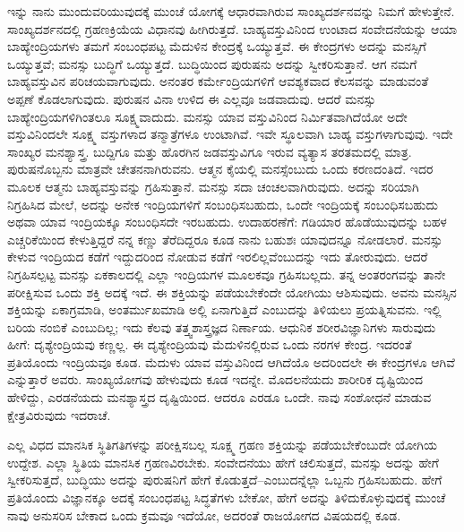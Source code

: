ಇನ್ನು ನಾನು ಮುಂದುವರಿಯುವುದಕ್ಕೆ ಮುಂಚೆ ಯೋಗಕ್ಕೆ ಆಧಾರವಾಗಿರುವ ಸಾಂಖ್ಯದರ್ಶನವನ್ನು ನಿಮಗೆ ಹೇಳುತ್ತೇನೆ. ಸಾಂಖ್ಯದರ್ಶನದಲ್ಲಿ ಗ್ರಹಣಕ್ರಿಯೆಯ ವಿಧಾನವು ಹೀಗಿರುತ್ತದೆ. ಬಾಹ್ಯವಸ್ತುವಿನಿಂದ ಉಂಟಾದ ಸಂವೇದನೆಯನ್ನು ಆಯಾ ಬಾಹ್ಯೇಂದ್ರಿಯಗಳು ತಮಗೆ ಸಂಬಂಧಪಟ್ಟ ಮೆದುಳಿನ ಕೇಂದ್ರಕ್ಕೆ ಒಯ್ಯುತ್ತವೆ. ಈ ಕೇಂದ್ರಗಳು ಅದನ್ನು ಮನಸ್ಸಿಗೆ ಒಯ್ಯುತ್ತವೆ; ಮನಸ್ಸು ಬುದ್ಧಿಗೆ ಒಯ್ಯುತ್ತದೆ. ಬುದ್ಧಿಯಿಂದ ಪುರುಷನು ಅದನ್ನು ಸ್ವೀಕರಿಸುತ್ತಾನೆ. ಆಗ ನಮಗೆ ಬಾಹ್ಯವಸ್ತುವಿನ ಪರಿಚಯವಾಗುವುದು. ಅನಂತರ ಕರ್ಮೇಂದ್ರಿಯಗಳಿಗೆ ಆವಶ್ಯಕವಾದ ಕೆಲಸವನ್ನು ಮಾಡುವಂತೆ ಅಪ್ಪಣೆ ಕೊಡಲಾಗುವುದು. ಪುರುಷನ ವಿನಾ ಉಳಿದ ಈ ಎಲ್ಲವೂ ಜಡವಾದುವು. ಆದರೆ ಮನಸ್ಸು ಬಾಹ್ಯೇಂದ್ರಿಯಗಳಿಗಿಂತಲೂ ಸೂಕ್ಷ್ಮವಾದುದು. ಮನಸ್ಸು ಯಾವ ವಸ್ತುವಿನಿಂದ ನಿರ್ಮಿತವಾಗಿದೆಯೋ ಅದೇ ವಸ್ತುವಿನಿಂದಲೇ ಸೂಕ್ಷ್ಮ ವಸ್ತುಗಳಾದ ತನ್ಮಾತ್ರೆಗಳೂ ಉಂಟಾಗಿವೆ. ಇವೇ ಸ್ಥೂಲವಾಗಿ ಬಾಹ್ಯ ವಸ್ತುಗಳಾಗುವುವು. ಇದೇ ಸಾಂಖ್ಯರ ಮನಶ್ಯಾಸ್ತ್ರ. ಬುದ್ದಿಗೂ ಮತ್ತು ಹೊರಗಿನ ಜಡವಸ್ತುವಿಗೂ ಇರುವ ವ್ಯತ್ಯಾಸ ತರತಮದಲ್ಲಿ ಮಾತ್ರ. ಪುರುಷನೊಬ್ಬನು ಮಾತ್ರವೇ ಚೇತನನಾಗಿರುವನು. ಆತ್ಮನ ಕೈಯಲ್ಲಿ ಮನಸ್ಸೆಂಬುದು ಒಂದು ಕರಣದಂತಿದೆ. ಇದರ ಮೂಲಕ ಆತ್ಮನು ಬಾಹ್ಯವಸ್ತುವನ್ನು ಗ್ರಹಿಸುತ್ತಾನೆ. ಮನಸ್ಸು ಸದಾ ಚಂಚಲವಾಗಿರುವುದು. ಅದನ್ನು ಸರಿಯಾಗಿ ನಿಗ್ರಹಿಸಿದ ಮೇಲೆ, ಅದನ್ನು ಅನೇಕ ಇಂದ್ರಿಯಗಳಿಗೆ ಸಂಬಂಧಿಸಬಹುದು, ಒಂದೇ ಇಂದ್ರಿಯಕ್ಕೆ ಸಂಬಂಧಿಸಬಹುದು ಅಥವಾ ಯಾವ ಇಂದ್ರಿಯಕ್ಕೂ ಸಂಬಂಧಿಸದೇ ಇರಬಹುದು. ಉದಾಹರಣೆಗೆ: ಗಡಿಯಾರ ಹೊಡೆಯುವುದನ್ನು ಬಹಳ ಎಚ್ಚರಿಕೆಯಿಂದ ಕೇಳುತ್ತಿದ್ದರೆ ನನ್ನ ಕಣ್ಣು ತೆರೆದಿದ್ದರೂ ಕೂಡ ನಾನು ಬಹುಶಃ ಯಾವುದನ್ನೂ ನೋಡಲಾರೆ. ಮನಸ್ಸು ಕೇಳುವ ಇಂದ್ರಿಯದ ಕಡೆಗೆ ಇದ್ದುದರಿಂದ ನೋಡುವ ಕಡೆಗೆ ಇರಲಿಲ್ಲವೆಂಬುದನ್ನು ಇದು ತೋರುವುದು. ಆದರೆ ನಿಗ್ರಹಿಸಲ್ಪಟ್ಟ ಮನಸ್ಸು ಏಕಕಾಲದಲ್ಲಿ ಎಲ್ಲಾ ಇಂದ್ರಿಯಗಳ ಮೂಲಕವೂ ಗ್ರಹಿಸಬಲ್ಲದು. ತನ್ನ ಅಂತರಂಗವನ್ನು ತಾನೇ ಪರೀಕ್ಷಿಸುವ ಒಂದು ಶಕ್ತಿ ಅದಕ್ಕೆ ಇದೆ. ಈ ಶಕ್ತಿಯನ್ನು ಪಡೆಯಬೇಕೆಂದೇ ಯೋಗಿಯು ಆಶಿಸುವುದು. ಅವನು ಮನಸ್ಸಿನ ಶಕ್ತಿಯನ್ನು ಏಕಾಗ್ರಮಾಡಿ, ಅಂತರ್ಮುಖಮಾಡಿ ಅಲ್ಲಿ ಏನಾಗುತ್ತಿದೆ ಎಂಬುದನ್ನು ತಿಳಿಯಲು ಪ್ರಯತ್ನಿಸುವನು. ಇಲ್ಲಿ ಬರಿಯ ನಂಬಿಕೆ ಎಂಬುದಿಲ್ಲ; ಇದು ಕೆಲವು ತತ್ತ್ವಶಾಸ್ತ್ರಜ್ಞದ ನಿರ್ಣಾಯ. ಆಧುನಿಕ ಶರೀರವಿಜ್ಞಾನಿಗಳು ಸಾರುವುದು ಹೀಗೆ: ದೃಶ್ಯೇಂದ್ರಿಯವು ಕಣ್ಣಲ್ಲ. ಈ ದೃಶ್ಯೇಂದ್ರಿಯವು ಮೆದುಳಿನಲ್ಲಿರುವ ಒಂದು ನರಗಳ ಕೇಂದ್ರ. ಇದರಂತೆ ಪ್ರತಿಯೊಂದು ಇಂದ್ರಿಯವೂ ಕೂಡ. ಮೆದುಳು ಯಾವ ವಸ್ತುವಿನಿಂದ ಆಗಿದೆಯೊ ಅದರಿಂದಲೇ ಈ ಕೇಂದ್ರಗಳೂ ಆಗಿವೆ ಎನ್ನುತ್ತಾರೆ ಅವರು. ಸಾಂಖ್ಯಯೋಗವು ಹೇಳುವುದು ಕೂಡ ಇದನ್ನೇ. ಮೊದಲನೆಯದು ಶಾರೀರಿಕ ದೃಷ್ಟಿಯಿಂದ ಹೇಳಿದ್ದು, ಎರಡನೆಯದು ಮನಶ್ಯಾಸ್ತ್ರದ ದೃಷ್ಟಿಯಿಂದ. ಆದರೂ ಎರಡೂ ಒಂದೇ. ನಾವು ಸಂಶೋಧನೆ ಮಾಡುವ ಕ್ಷೇತ್ರವಿರುವುದು ಇದರಾಚೆ. 

ಎಲ್ಲ ವಿಧದ ಮಾನಸಿಕ ಸ್ಥಿತಿಗತಿಗಳನ್ನು ಪರೀಕ್ಷಿಸಬಲ್ಲ ಸೂಕ್ಷ್ಮ ಗ್ರಹಣ ಶಕ್ತಿಯನ್ನು ಪಡೆಯಬೇಕೆಂಬುದೇ ಯೋಗಿಯ ಉದ್ದೇಶ. ಎಲ್ಲಾ ಸ್ಥಿತಿಯ ಮಾನಸಿಕ ಗ್ರಹಣವಿರಬೇಕು. ಸಂವೇದನೆಯು ಹೇಗೆ ಚಲಿಸುತ್ತದೆ, ಮನಸ್ಸು ಅದನ್ನು ಹೇಗೆ ಸ್ವೀಕರಿಸುತ್ತದೆ, ಬುದ್ಧಿಯು ಅದನ್ನು ಪುರುಷನಿಗೆ ಹೇಗೆ ಕೊಡುತ್ತದೆ–ಎಂಬುದನ್ನೆಲ್ಲಾ ಒಬ್ಬನು ಗ್ರಹಿಸಬಹುದು. ಹೇಗೆ ಪ್ರತಿಯೊಂದು ವಿಜ್ಞಾನಕ್ಕೂ ಅದಕ್ಕೆ ಸಂಬಂಧಪಟ್ಟ ಸಿದ್ಧತೆಗಳು ಬೇಕೋ, ಹೇಗೆ ಅದನ್ನು ತಿಳಿದುಕೊಳ್ಳುವುದಕ್ಕೆ ಮುಂಚೆ ನಾವು ಅನುಸರಿಸ ಬೇಕಾದ ಒಂದು ಕ್ರಮವೂ ಇದೆಯೋ, ಅದರಂತೆ ರಾಜಯೋಗದ ವಿಷಯದಲ್ಲಿ ಕೂಡ. 

